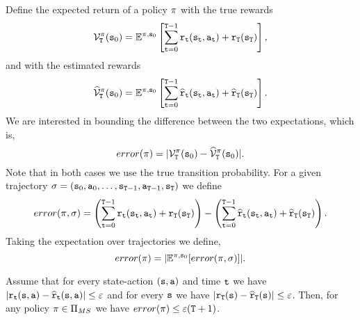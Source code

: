 Define the expected return of a policy $\pi$ with the true rewards
\[
\mathcal{V}^\pi_{\tt T}({\tt s}_0)=\mathbb{E}^{\pi,{\tt s}_0}\left[\sum_{{\tt t}=0}^{{\tt T}-1}
{\tt r}_{\tt t}({\tt s}_{\tt t},{\tt a}_{\tt t})+{\tt r}_{\tt T}({\tt s}_{\tt T})\right],
\]
and with the estimated rewards
\[
\widehat{\mathcal{V}}^\pi_{\tt T}({\tt s}_0)=\mathbb{E}^{\pi,{\tt s}_0}\left[\sum_{{\tt t}=0}^{{\tt T}-1}
\widehat{{\tt r}}_{\tt t}({\tt s}_{\tt t},{\tt a}_{\tt t})+\widehat{{\tt r}}_{\tt T}({\tt s}_{\tt T})\right].
\]
We are interested in bounding the difference between the two expectations, which is,
\[
error(\pi)=|\mathcal{V}^\pi_{\tt T}({\tt s}_0)-\widehat{\mathcal{V}}^\pi_{\tt T}({\tt s}_0)|.
\]
Note that in both cases we use the true transition probability. For
a given trajectory $\sigma=({\tt s}_0,{\tt a}_0,\ldots,
{\tt s}_{{\tt T}-1},{\tt a}_{{\tt T}-1},{\tt s}_{\tt T})$ we
define
\[
error(\pi,\sigma)= \left(\sum_{{\tt t}=0}^{{\tt T}-1}
{\tt r}_{\tt t}({\tt s}_{\tt t},{\tt a}_{\tt t})+{\tt r}_{\tt T}({\tt s}_{\tt T})\right)-
\left(\sum_{{\tt t}=0}^{{\tt T}-1}
\widehat{{\tt r}}_{\tt t}({\tt s}_{\tt t},{\tt a}_{\tt t})+\widehat{{\tt r}}_{\tt T}({\tt s}_{\tt T})\right).
\]
Taking the expectation over trajectories we define,
\[
error(\pi)=|\mathbb{E}^{\pi,{\tt s}_0} [error(\pi,\sigma)]|.
\]

\begin{lemma}
\label{lemma:approx-FH-error}
%
Assume that for every state-action $({\tt s},{\tt a})$ and time ${\tt t}$ we have
$|{\tt r}_{\tt t}({\tt s},{\tt a})-\widehat{{\tt r}}_{\tt t}({\tt s},{\tt a})|\leq
\varepsilon$ and for every ${\tt s}$ we have
$|{\tt r}_{\tt T}({\tt s})-\widehat{{\tt r}}_{\tt T}({\tt s})|\leq
\varepsilon$. Then, for any policy $\pi\in  {\Pi _{MS}}$ we have
$error(\pi)\leq \varepsilon({\tt T}+1)$.
\end{lemma}

